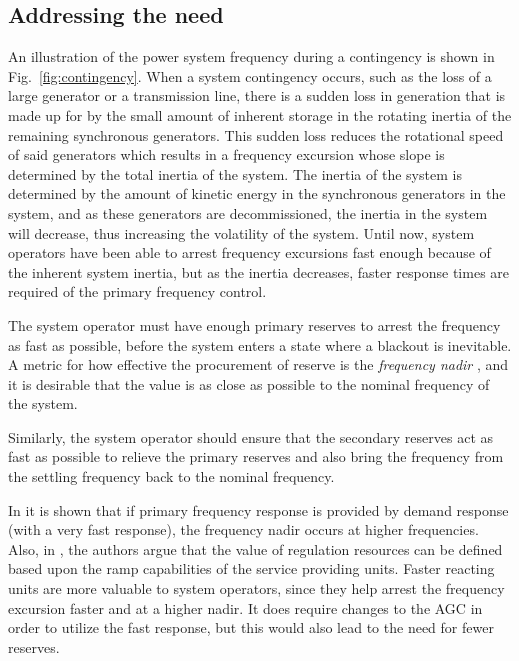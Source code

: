 \subsection*{Addressing the need}
An illustration of the power system frequency during a contingency is shown in Fig.~\ref{fig:contingency}. When a system contingency occurs, such as the loss of a large generator or a transmission line, there is a sudden loss in generation that is made up for by the small amount of inherent storage in the rotating inertia of the remaining synchronous generators. This sudden loss reduces the rotational speed of said generators which results in a frequency excursion whose slope is determined by the total inertia of the system. The inertia of the system is determined by the amount of kinetic energy in the synchronous generators in the system, and as these generators are decommissioned, the inertia in the system will decrease, thus increasing the volatility of the system. Until now, system operators have been able to arrest frequency excursions fast enough because of the inherent system inertia, but as the inertia decreases, faster response times are required of the primary frequency control. 

The system operator must have enough primary reserves to arrest the frequency as fast as possible, before the system enters a state where a blackout is inevitable. A metric for how effective the procurement of reserve is the \emph{frequency nadir} \cite{eto2010use}, and it is desirable that the value is as close as possible to the nominal frequency of the system.

Similarly, the system operator should ensure that the secondary reserves act as fast as possible to relieve the primary reserves and also bring the frequency from the settling frequency back to the nominal frequency.

In \cite{vrettos2015integrating} it is shown that if primary frequency response is provided by demand response (with a very fast response), the frequency nadir occurs at higher frequencies. 
Also, in \cite{makarov2008assessing}, the authors argue that the value of regulation resources can be defined based upon the ramp capabilities of the service providing units. Faster reacting units are more valuable to system operators, since they help arrest the frequency excursion faster and at a higher nadir. It does require changes to the AGC in order to utilize the fast response, but this would also lead to the need for fewer reserves.

